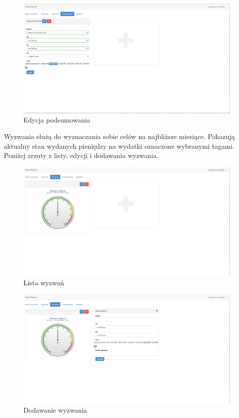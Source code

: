 \documentclass[10pt,titlepage]{article}
\begin{document}
\begin{figure}[H]
  \centering
  \includegraphics[scale=0.2]{images/screen_podsumowaniaEdycja.png}
  \caption{Edycja podsumowania}
  \label{screen:editSummary}
\end{figure}
\par Wyzwania służą do wyznaczania sobie celów na najbliższe miesiące. Pokazują aktualny stan wydanych pieniędzy na wydatki oznaczone wybranymi tagami. Poniżej zrzuty z listy, edycji i dodawania wyzwania.
\begin{figure}[H]
  \centering
  \includegraphics[scale=0.2]{images/screen_wyzwania.png}
  \caption{Lista wyzwań}
\end{figure}
\begin{figure}[H]
  \centering
  \includegraphics[scale=0.2]{images/screen_wyzwaniaDodaj.png}
  \caption{Dodawanie wyzwania}
\end{figure}
\end{document}
